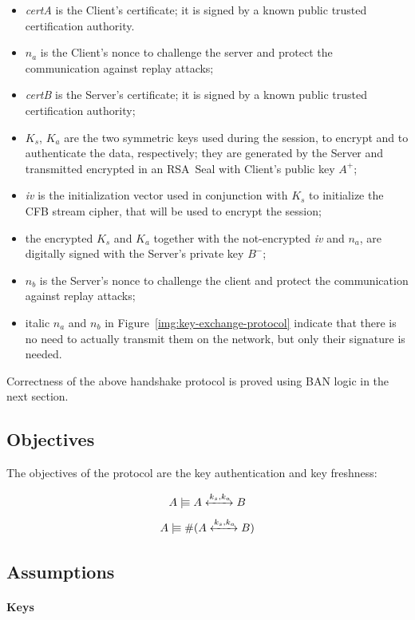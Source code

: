 \documentclass[a4paper,12pt]{article}
\newcommand{\believes}{\mid\!\equiv}
\newcommand{\fresh}[1]{\#(#1)}
\newcommand{\sharekey}[1]{\xleftrightarrow{#1}}
\begin{document}
\begin{itemize}
  \item \emph{certA} is the Client's certificate; it is signed by a known public trusted certification authority.
  \item $n_a$ is the Client's nonce to challenge the server and protect the communication against replay attacks;
  \item \emph{certB} is the Server's certificate; it is signed by a known public trusted certification authority;
  \item $K_s$, $K_a$ are the two symmetric keys used during the session, to encrypt and to authenticate the data, respectively; they are generated by the Server and transmitted encrypted in an RSA~Seal with Client's public key $A^{+}$;
  \item \emph{iv} is the initialization vector used in conjunction with $K_s$ to initialize the CFB stream cipher, that will be used to encrypt the session;
  \item the encrypted $K_s$ and $K_a$ together with the not-encrypted \emph{iv} and $n_a$, are digitally signed with the Server's private key $B^{-}$;
  \item $n_b$ is the Server's nonce to challenge the client and protect the communication against replay attacks;
  \item italic $n_a$ and $n_b$ in Figure~\ref{img:key-exchange-protocol} indicate that there is no need to actually transmit them on the network, but only their signature is needed.
\end{itemize}

Correctness of the above handshake protocol is proved using BAN logic in the next section.

\subsection{Objectives}

The objectives of the protocol are the key authentication and key freshness:

\[A \believes A \sharekey{k_s, k_a} B \]
\[A \believes \fresh{A \sharekey{k_s, k_a} B} \]

\subsection{Assumptions}

\paragraph{Keys}
\end{document}
